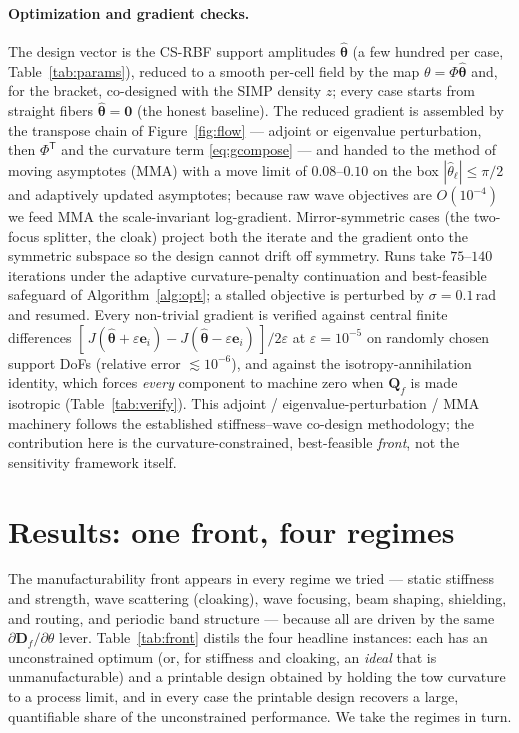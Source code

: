 \documentclass[preprint,11pt]{elsarticle}
\newcommand{\Tp}{^{\mathsf{T}}}
\newcommand{\Df}{\mathbf{D}_f}
\newcommand{\Qf}{\mathbf{Q}_f}
\theoremstyle{plain}\newtheorem{proposition}{Proposition}
\theoremstyle{remark}\newtheorem{remark}{Remark}
\begin{document}
\paragraph{Optimization and gradient checks.} The design vector is the CS-RBF support
amplitudes $\hat{\bm\theta}$ (a few hundred per case, Table~\ref{tab:params}), reduced to a
smooth per-cell field by the map $\theta=\Phi\hat{\bm\theta}$ and, for the bracket,
co-designed with the SIMP density $z$; every case starts from straight fibers
$\hat{\bm\theta}=\mathbf 0$ (the honest baseline). The reduced gradient is assembled by the
transpose chain of Figure~\ref{fig:flow} --- adjoint or eigenvalue perturbation, then
$\Phi\Tp$ and the curvature term \eqref{eq:gcompose} --- and handed to the method of moving
asymptotes (MMA) with a move limit of $0.08$--$0.10$ on the box $|\hat\theta_\ell|\le\pi/2$
and adaptively updated asymptotes; because raw wave objectives are $O(10^{-4})$ we feed MMA
the scale-invariant log-gradient. Mirror-symmetric cases (the two-focus splitter, the cloak)
project both the iterate and the gradient onto the symmetric subspace so the design cannot
drift off symmetry. Runs take $75$--$140$ iterations under the adaptive curvature-penalty
continuation and best-feasible safeguard of Algorithm~\ref{alg:opt}; a stalled objective is
perturbed by $\sigma=0.1$\,rad and resumed. Every non-trivial gradient is verified against
central finite differences $[\,J(\hat{\bm\theta}+\varepsilon\mathbf e_i)-J(\hat{\bm\theta}
-\varepsilon\mathbf e_i)\,]/2\varepsilon$ at $\varepsilon=10^{-5}$ on randomly chosen support
DoFs (relative error $\lesssim10^{-6}$), and against the isotropy-annihilation identity,
which forces \emph{every} component to machine zero when $\Qf$ is made isotropic
(Table~\ref{tab:verify}). This adjoint / eigenvalue-perturbation / MMA machinery follows the
established stiffness--wave co-design methodology; the contribution here is the
curvature-constrained, best-feasible \emph{front}, not the sensitivity framework itself.

\section{Results: one front, four regimes}
\label{sec:results}
The manufacturability front appears in every regime we tried --- static stiffness and
strength, wave scattering (cloaking), wave focusing, beam shaping, shielding, and routing,
and periodic band structure --- because all are driven by the same $\partial\Df/\partial
\theta$ lever. Table~\ref{tab:front} distils the four headline instances: each has an
unconstrained optimum (or, for stiffness and cloaking, an \emph{ideal} that is
unmanufacturable) and a printable design obtained by holding the tow curvature to a process
limit, and in every case the printable design recovers a large, quantifiable share of the
unconstrained performance. We take the regimes in turn.
\end{document}
